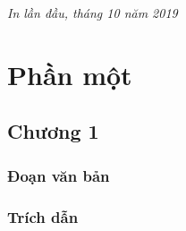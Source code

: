 \documentclass[12pt,fleqn]{book} %
\begin{document}
\noindent \textit{In lần đầu, tháng 10 năm 2019} %




\pagestyle{empty} %

\tableofcontents %

\cleardoublepage %

\pagestyle{fancy} %


\part{Phần một}



\chapter{Chương 1}

\section{Đoạn văn bản}

\lipsum[1-7] %


\section{Trích dẫn}
\end{document}
